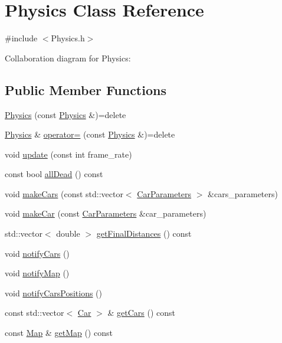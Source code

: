 \hypertarget{classPhysics}{}\section{Physics Class Reference}
\label{classPhysics}


{\ttfamily \#include $<$Physics.\+h$>$}



Collaboration diagram for Physics\+:
\subsection*{Public Member Functions}
\begin{DoxyCompactItemize}
\item 
\hyperlink{classPhysics_a6fe4747c42265cefae8a24b9a2a291ad}{Physics} (const \hyperlink{classPhysics}{Physics} \&)=delete
\item 
\hyperlink{classPhysics}{Physics} \& \hyperlink{classPhysics_ac67d8ce0efaaaf9b442863f8085619fe}{operator=} (const \hyperlink{classPhysics}{Physics} \&)=delete
\item 
void \hyperlink{classPhysics_a8ae58a3feb584b913d9fef04be7051b0}{update} (const int frame\+\_\+rate)
\item 
const bool \hyperlink{classPhysics_a44933e5f70128b1ff6d0ccb6dd7b3628}{all\+Dead} () const
\item 
void \hyperlink{classPhysics_a0c2c8ee78b42f9727d420f2fbb624e5a}{make\+Cars} (const std\+::vector$<$ \hyperlink{classCarParameters}{Car\+Parameters} $>$ \&cars\+\_\+parameters)
\item 
void \hyperlink{classPhysics_ad42659995ef232bb751eac09d0a4e8d9}{make\+Car} (const \hyperlink{classCarParameters}{Car\+Parameters} \&car\+\_\+parameters)
\item 
std\+::vector$<$ double $>$ \hyperlink{classPhysics_a185e8476eebb2de5d8b26e52f14d864b}{get\+Final\+Distances} () const
\item 
void \hyperlink{classPhysics_a466b0a9be955dcf7afd58afdd396a560}{notify\+Cars} ()
\item 
void \hyperlink{classPhysics_adb2d289adeba022a24562bfcd374df38}{notify\+Map} ()
\item 
void \hyperlink{classPhysics_a5ec463e5f4ccd5830de8c85c2398caaf}{notify\+Cars\+Positions} ()
\item 
const std\+::vector$<$ \hyperlink{classCar}{Car} $>$ \& \hyperlink{classPhysics_a1a235bab70736238746e3028799680e5}{get\+Cars} () const
\item 
const \hyperlink{classMap}{Map} \& \hyperlink{classPhysics_ad18d164ad1e718a207e5d5d16bff9f0c}{get\+Map} () const
\end{DoxyCompactItemize}
